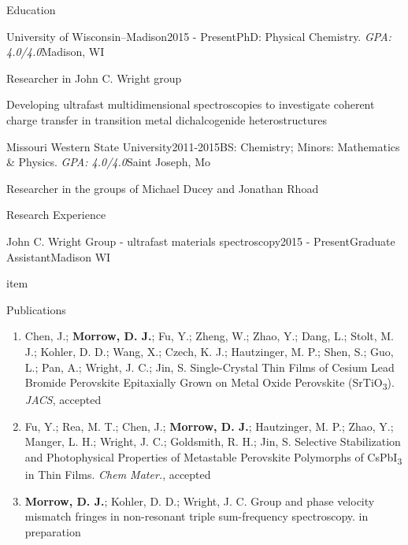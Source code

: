 \documentclass{resume} %
\begin{document}
\begin{rSection}{Education}

\begin{rSubsection}{University of Wisconsin--Madison}{2015 - Present}{PhD: Physical Chemistry. \emph{GPA: 4.0/4.0}}{Madison, WI}
\item Researcher in John C. Wright group
\item Developing ultrafast multidimensional spectroscopies to investigate coherent charge transfer in transition metal dichalcogenide heterostructures
\end{rSubsection}

\begin{rSubsection}{Missouri Western State University}{2011-2015}{BS: Chemistry; Minors: Mathematics \& Physics. \emph{GPA: 4.0/4.0}}{Saint Joseph, Mo} 
\item Researcher in the groups of Michael Ducey and Jonathan Rhoad
\end{rSubsection}



\end{rSection}


\begin{rSection}{Research Experience}

\begin{rSubsection}{John C. Wright Group - ultrafast materials spectroscopy}{2015 - Present}{Graduate Assistant}{Madison WI}
\item item
\end{rSubsection}




\end{rSection}


\begin{rSection}{Publications}
	
\begin{enumerate}[leftmargin = 0 pt]

\item Chen, J.; \textbf{Morrow, D. J.}; Fu, Y.; Zheng, W.; Zhao, Y.; Dang, L.; Stolt, M. J.; Kohler, D. D.; Wang, X.; Czech, K. J.; Hautzinger, M. P.; Shen, S.; Guo, L.; Pan, A.; Wright, J. C.; Jin, S. Single-Crystal Thin Films of Cesium Lead Bromide Perovskite Epitaxially Grown on Metal Oxide Perovskite (SrTiO\textsubscript{3}). \emph{JACS}, accepted 
	
\item Fu, Y.; Rea, M. T.; Chen, J.; \textbf{Morrow, D. J.}; Hautzinger, M. P.; Zhao, Y.; Manger, L. H.; Wright, J. C.; Goldsmith, R. H.; Jin, S. Selective Stabilization and Photophysical Properties of
Metastable Perovskite Polymorphs of CsPbI\textsubscript{3} in Thin Films. \emph{Chem Mater.}, accepted 


\item \textbf{Morrow, D. J.}; Kohler, D. D.; Wright, J. C. Group and phase velocity mismatch fringes in non-resonant triple sum-frequency spectroscopy. in preparation 

\end{enumerate}

\end{rSection}
\end{document}
